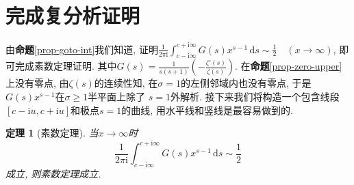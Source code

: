 \documentclass[12pt, a4paper, oneside]{ctexart}
\newtheorem{theorem}{定理}[section] %
\numberwithin{equation}{section}  %
\let\geq=\geqslant %
\def\d{\mathrm{d}}          %
\def\i{\mathrm{i}}          %
\begin{document}
\section{完成复分析证明}
由\textbf{命题}\ref{prop-goto-int}我们知道, 证明$\frac{1}{2\pi \i}\int_{c-\i\infty}^{c+\i\infty}G(s)x^{s-1}\,\d s\sim\frac{1}{2}\quad(x\to\infty)$, 即可完成素数定理证明. 其中$G(s) = \frac{1}{s(s+1)}\left(-\frac{\zeta'(s)}{\zeta(s)}\right)$. 在\textbf{命题}\ref{prop-zero-upper}上没有零点, 由$\zeta(s)$的连续性知, 在$\sigma=1$的左侧邻域内也没有零点, 于是$G(s)x^{s-1}$在$\sigma\geq 1$半平面上除了 $s=1$外解析. 接下来我们将构造一个包含线段$[c-\i u,c+\i u]$和极点$s=1$的曲线, 用水平线和竖线是最容易做到的.
\begin{theorem}[素数定理]
    当$x\to \infty$时
    \begin{equation*}
        \frac{1}{2\pi\i}\int_{c-\i \infty}^{c+\i\infty}G(s)x^{s-1}\,\d s\sim \frac{1}{2}
    \end{equation*}
    成立, 则素数定理成立.
\end{theorem}
\end{document}
